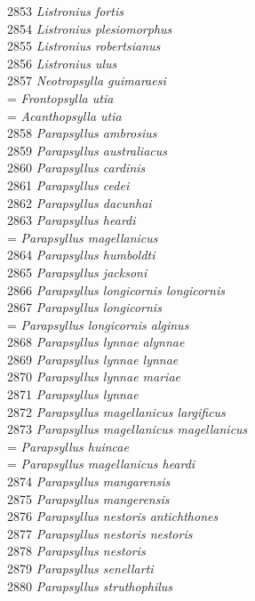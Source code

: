 \documentclass[
]{article}
\begin{document}
2853 \emph{Listronius fortis}\\
2854 \emph{Listronius plesiomorphus}\\
2855 \emph{Listronius robertsianus}\\
2856 \emph{Listronius ulus}\\
2857 \emph{Neotropsylla guimaraesi}\\
= \emph{Frontopsylla utia}\\
= \emph{Acanthopsylla utia}\\
2858 \emph{Parapsyllus ambrosius}\\
2859 \emph{Parapsyllus australiacus}\\
2860 \emph{Parapsyllus cardinis}\\
2861 \emph{Parapsyllus cedei}\\
2862 \emph{Parapsyllus dacunhai}\\
2863 \emph{Parapsyllus heardi}\\
= \emph{Parapsyllus magellanicus}\\
2864 \emph{Parapsyllus humboldti}\\
2865 \emph{Parapsyllus jacksoni}\\
2866 \emph{Parapsyllus longicornis longicornis}\\
2867 \emph{Parapsyllus longicornis}\\
= \emph{Parapsyllus longicornis alginus}\\
2868 \emph{Parapsyllus lynnae alynnae}\\
2869 \emph{Parapsyllus lynnae lynnae}\\
2870 \emph{Parapsyllus lynnae mariae}\\
2871 \emph{Parapsyllus lynnae}\\
2872 \emph{Parapsyllus magellanicus largificus}\\
2873 \emph{Parapsyllus magellanicus magellanicus}\\
= \emph{Parapsyllus huincae}\\
= \emph{Parapsyllus magellanicus heardi}\\
2874 \emph{Parapsyllus mangarensis}\\
2875 \emph{Parapsyllus mangerensis}\\
2876 \emph{Parapsyllus nestoris antichthones}\\
2877 \emph{Parapsyllus nestoris nestoris}\\
2878 \emph{Parapsyllus nestoris}\\
2879 \emph{Parapsyllus senellarti}\\
2880 \emph{Parapsyllus struthophilus}\\
\end{document}
